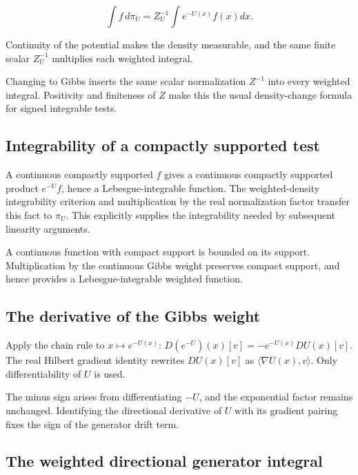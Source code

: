 \documentclass[11pt,a4paper]{report}
\begin{document}
\[\int f\,d\pi_U=Z_U^{-1}\int e^{-U(x)}f(x)dx.\]

 Continuity of the potential makes the density measurable, and the same finite scalar \(Z_U^{-1}\) multiplies each weighted integral.



Changing to Gibbs inserts the same scalar normalization \(Z^{-1}\) into every weighted integral. Positivity and finiteness of \(Z\) make this the usual density-change formula for signed integrable tests.

\subsection{\texorpdfstring{Integrability of a compactly supported test}{Integrability of a compactly supported test}}
\label{report-step-UnadjustedLangevin-Generator-lean-4}


A continuous compactly supported \(f\) gives a continuous compactly supported product \(e^{-U}f\), hence a Lebesgue-integrable function. The weighted-density integrability criterion and multiplication by the real normalization factor transfer this fact to \(\pi_U\). This explicitly supplies the integrability needed by subsequent linearity arguments.



A continuous function with compact support is bounded on its support. Multiplication by the continuous Gibbs weight preserves compact support, and hence provides a Lebesgue-integrable weighted function.

\subsection{\texorpdfstring{The derivative of the Gibbs weight}{The derivative of the Gibbs weight}}
\label{report-step-UnadjustedLangevin-Generator-lean-5}


Apply the chain rule to \(x\mapsto e^{-U(x)}\): \(D(e^{-U})(x)[v]=-e^{-U(x)}DU(x)[v]\). The real Hilbert gradient identity rewrites \(DU(x)[v]\) as \(\langle\nabla U(x),v\rangle\). Only differentiability of \(U\) is used.



The minus sign arises from differentiating \(-U\), and the exponential factor remains unchanged. Identifying the directional derivative of \(U\) with its gradient pairing fixes the sign of the generator drift term.

\subsection{\texorpdfstring{The weighted directional generator integral}{The weighted directional generator integral}}
\label{report-step-UnadjustedLangevin-Generator-lean-6}
\end{document}
